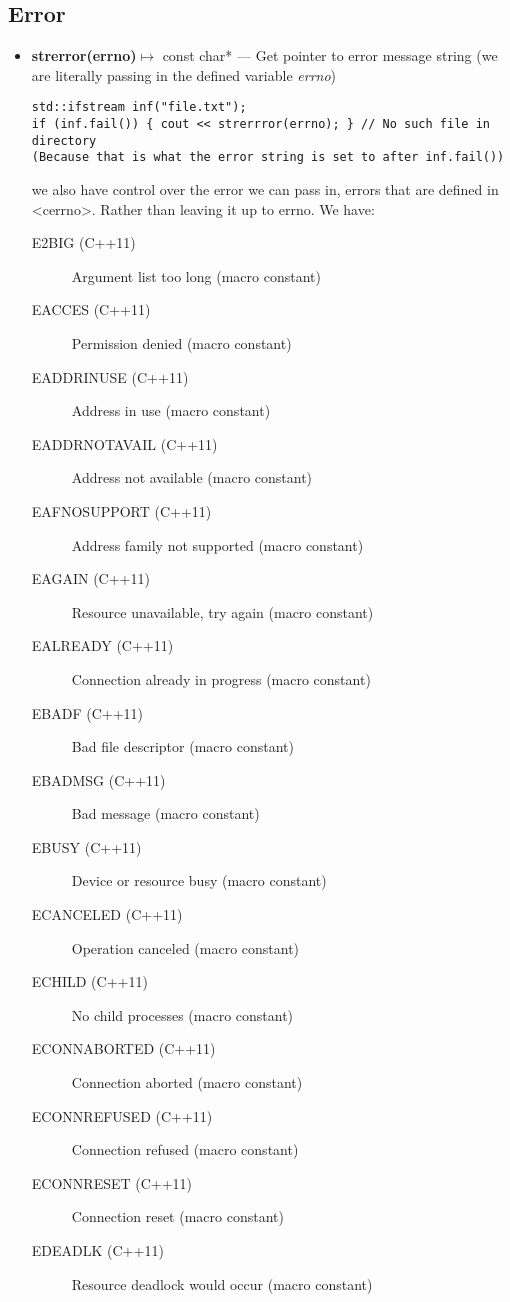 \documentclass{report}
\begin{document}
    \subsection{Error}
    \begin{itemize}
        \item \textbf{strerror(errno)}$\mapsto$ const char* ---  Get pointer to error message string (we are literally passing in the defined variable \textit{errno})
            \begin{verbatim}
std::ifstream inf("file.txt");
if (inf.fail()) { cout << strerrror(errno); } // No such file in directory 
(Because that is what the error string is set to after inf.fail())
            \end{verbatim}
        we also have control over the error we can pass in, errors that are defined in <cerrno>. Rather than leaving it up to errno. We have:
    \begin{description}
      \item[E2BIG (C++11)] Argument list too long (macro constant)
      \item[EACCES (C++11)] Permission denied (macro constant)
      \item[EADDRINUSE (C++11)] Address in use (macro constant)
      \item[EADDRNOTAVAIL (C++11)] Address not available (macro constant)
      \item[EAFNOSUPPORT (C++11)] Address family not supported (macro constant)
      \item[EAGAIN (C++11)] Resource unavailable, try again (macro constant)
      \item[EALREADY (C++11)] Connection already in progress (macro constant)
      \item[EBADF (C++11)] Bad file descriptor (macro constant)
      \item[EBADMSG (C++11)] Bad message (macro constant)
      \item[EBUSY (C++11)] Device or resource busy (macro constant)
      \item[ECANCELED (C++11)] Operation canceled (macro constant)
      \item[ECHILD (C++11)] No child processes (macro constant)
      \item[ECONNABORTED (C++11)] Connection aborted (macro constant)
      \item[ECONNREFUSED (C++11)] Connection refused (macro constant)
      \item[ECONNRESET (C++11)] Connection reset (macro constant)
      \item[EDEADLK (C++11)] Resource deadlock would occur (macro constant)

\end{description}
\end{itemize}
\end{document}
